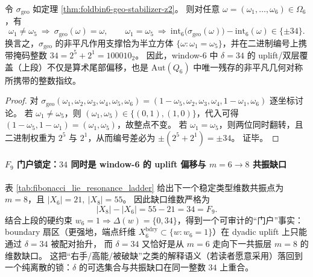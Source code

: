 \begin{corollary}[\texorpdfstring{$34=100010_2$}{34=100010_2} 的几何来源：半立方体支撑与 \texorpdfstring{$\pm 34$}{+-34} 偏移]\label{cor:foldbin6-geo-mask-34}
令 \(\sigma_{\mathrm{geo}}\) 如定理 \ref{thm:foldbin6-geo-stabilizer-z2}。
则对任意 \(\omega=(\omega_1,\dots,\omega_6)\in\Omega_6\)，有
\[
\omega_1\neq \omega_5\ \Longrightarrow\ \sigma_{\mathrm{geo}}(\omega)=\omega,
\qquad
\omega_1=\omega_5\ \Longrightarrow\ \mathrm{int}_6\!\bigl(\sigma_{\mathrm{geo}}(\omega)\bigr)-\mathrm{int}_6(\omega)\in\{\pm 34\}.
\]
换言之，\(\sigma_{\mathrm{geo}}\) 的非平凡作用支撑恰为半立方体 \(\{\omega:\omega_1=\omega_5\}\)，并在二进制编号上携带掩码整数 \(34=2^5+2^1=100010_2\)。
因此，window-6 中 \(\delta=34\) 的 uplift/双层覆盖（上段）不仅是算术尾部偏移，也是 \(\mathrm{Aut}(Q_6)\) 中唯一残存的非平凡几何对称所携带的整数指纹。
\end{corollary}
\begin{proof}
对 \(\sigma_{\mathrm{geo}}(\omega_1,\omega_2,\omega_3,\omega_4,\omega_5,\omega_6)=(1-\omega_5,\omega_2,\omega_3,\omega_4,1-\omega_1,\omega_6)\) 逐坐标讨论。
若 \(\omega_1\neq\omega_5\)，则 \((\omega_1,\omega_5)\in\{(0,1),(1,0)\}\)，代入可得 \((1-\omega_5,1-\omega_1)=(\omega_1,\omega_5)\)，故整点不变。
若 \(\omega_1=\omega_5\)，则两位同时翻转，且二进制权重为 \(2^5\) 与 \(2^1\)，从而编号差必为 \(\pm(2^5+2^1)=\pm 34\)。
证毕。
\end{proof}

\paragraph{\texorpdfstring{$F_9$}{F9} 门户锁定：\texorpdfstring{$34$}{34} 同时是 window-6 的 uplift 偏移与 \texorpdfstring{$m=6\to 8$}{m=6->8} 共振缺口}
表 \ref{tab:fibonacci_lie_resonance_ladder} 给出下一个稳定类型维数共振点为 \(m=8\)，且
\(
|X_6|=21,\ |X_8|=55
\)。
因此缺口维数严格为
\[
|X_8|-|X_6|=55-21=34=F_9.
\]
结合上段的硬约束 \(w_6=1\Rightarrow \Delta(w)=\{0,34\}\)，得到一个可审计的“门户”事实：
boundary 扇区（更强地，端点纤维 \(X_6^{\mathrm{bdry}}\subset\{w:w_6=1\}\)）在 dyadic uplift 上只能通过 \(\delta=34\) 被配对抬升，
而 \(\delta=34\) 又恰好是从 \(m=6\) 走向下一共振层 \(m=8\) 的维数缺口。
这把“右手/高能/被破缺”之类的解释语义（若读者愿意采用）落回到一个纯离散的锁：\(\delta\) 的可选集合与共振缺口在同一整数 \(34\) 上重合。

